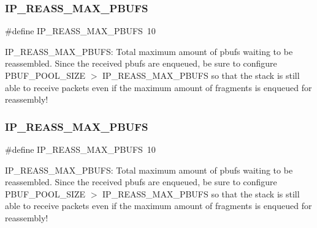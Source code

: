 \subsubsection{\texorpdfstring{I\+P\+\_\+\+R\+E\+A\+S\+S\+\_\+\+M\+A\+X\+\_\+\+P\+B\+U\+FS}{IP\_REASS\_MAX\_PBUFS}\hspace{0.1cm}{\footnotesize\ttfamily [1/2]}}
{\footnotesize\ttfamily \#define I\+P\+\_\+\+R\+E\+A\+S\+S\+\_\+\+M\+A\+X\+\_\+\+P\+B\+U\+FS~10}

I\+P\+\_\+\+R\+E\+A\+S\+S\+\_\+\+M\+A\+X\+\_\+\+P\+B\+U\+FS\+: Total maximum amount of pbufs waiting to be reassembled. Since the received pbufs are enqueued, be sure to configure P\+B\+U\+F\+\_\+\+P\+O\+O\+L\+\_\+\+S\+I\+ZE $>$ I\+P\+\_\+\+R\+E\+A\+S\+S\+\_\+\+M\+A\+X\+\_\+\+P\+B\+U\+FS so that the stack is still able to receive packets even if the maximum amount of fragments is enqueued for reassembly! \mbox{\label{group__lwip__opts__ipv4_ga29084a46d7d4be30e8029d356bca0394}} 
\subsubsection{\texorpdfstring{I\+P\+\_\+\+R\+E\+A\+S\+S\+\_\+\+M\+A\+X\+\_\+\+P\+B\+U\+FS}{IP\_REASS\_MAX\_PBUFS}\hspace{0.1cm}{\footnotesize\ttfamily [2/2]}}
{\footnotesize\ttfamily \#define I\+P\+\_\+\+R\+E\+A\+S\+S\+\_\+\+M\+A\+X\+\_\+\+P\+B\+U\+FS~10}

I\+P\+\_\+\+R\+E\+A\+S\+S\+\_\+\+M\+A\+X\+\_\+\+P\+B\+U\+FS\+: Total maximum amount of pbufs waiting to be reassembled. Since the received pbufs are enqueued, be sure to configure P\+B\+U\+F\+\_\+\+P\+O\+O\+L\+\_\+\+S\+I\+ZE $>$ I\+P\+\_\+\+R\+E\+A\+S\+S\+\_\+\+M\+A\+X\+\_\+\+P\+B\+U\+FS so that the stack is still able to receive packets even if the maximum amount of fragments is enqueued for reassembly! \mbox{\label{group__lwip__opts__ipv4_gad41122bd0b5485a18a4415c8f953727b}} 
